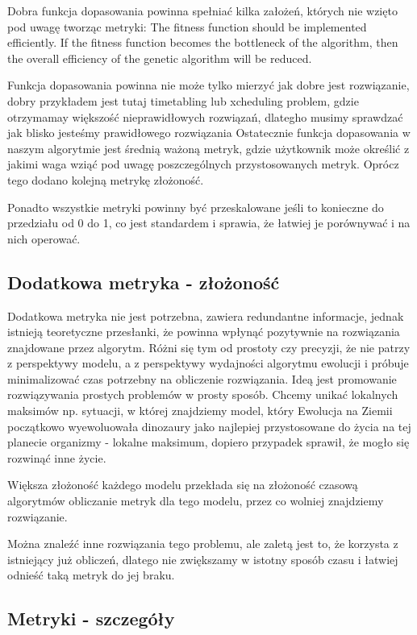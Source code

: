 Dobra funkcja dopasowania powinna spełniać kilka założeń, których nie wzięto pod uwagę tworząc metryki:
The fitness function should be implemented efficiently. If the fitness function becomes the bottleneck of the algorithm, then the overall efficiency of the genetic algorithm will be reduced. 

Funkcja dopasowania powinna nie może tylko mierzyć jak dobre jest rozwiązanie, dobry przykładem jest tutaj  
timetabling lub xcheduling problem, gdzie otrzymamay większość nieprawidłowych rozwiązań, dlategho musimy sprawdzać jak blisko jesteśmy prawidłowego rozwiązania \cite{icga85:cramer} \cite{beasley:1993:ogapf}
Ostatecznie funkcja dopasowania w naszym algorytmie jest średnią ważoną metryk, gdzie użytkownik może określić z jakimi waga wziąć pod uwagę poszczególnych przystosowanych metryk. Oprócz tego dodano kolejną metrykę złożoność.

Ponadto wszystkie metryki powinny być przeskalowane jeśli to konieczne do przedziału od 0 do 1, co jest standardem i sprawia, że łatwiej je porównywać i na nich operować.

\subsection{Dodatkowa metryka - złożoność}
Dodatkowa metryka nie jest potrzebna, zawiera redundantne informacje, jednak istnieją teoretyczne przesłanki, że powinna wpłynąć pozytywnie na rozwiązania znajdowane przez algorytm. 
Różni się tym od prostoty czy precyzji, że nie patrzy z perspektywy modelu, a z perspektywy wydajności algorytmu ewolucji i próbuje minimalizować czas potrzebny na obliczenie rozwiązania. 
Ideą jest promowanie rozwiązywania prostych problemów w prosty sposób. Chcemy unikać lokalnych maksimów np. sytuacji, w której znajdziemy model, który 
Ewolucja na Ziemii początkowo wyewoluowała dinozaury jako najlepiej przystosowane do życia na tej planecie organizmy - lokalne maksimum, dopiero przypadek sprawił, że mogło się rozwinąć inne życie.

Większa złożoność każdego modelu przekłada się na złożoność czasową algorytmów obliczanie metryk dla tego modelu, przez co wolniej znajdziemy rozwiązanie.

Można znaleźć inne rozwiązania tego problemu, ale zaletą jest to, że korzysta z istniejący już obliczeń, dlatego nie zwiększamy w istotny sposób czasu i łatwiej odnieść taką metryk do jej braku.

\subsection{Metryki - szczegóły}

